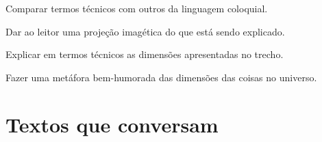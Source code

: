 \begin{escolha}
\item Comparar termos técnicos com outros da linguagem coloquial.
\item Dar ao leitor uma projeção imagética do que está sendo explicado.
\item Explicar em termos técnicos as dimensões apresentadas no trecho.
\item Fazer uma metáfora bem-humorada das dimensões das coisas no universo.
\end{escolha}



\chapter{Textos que conversam}


